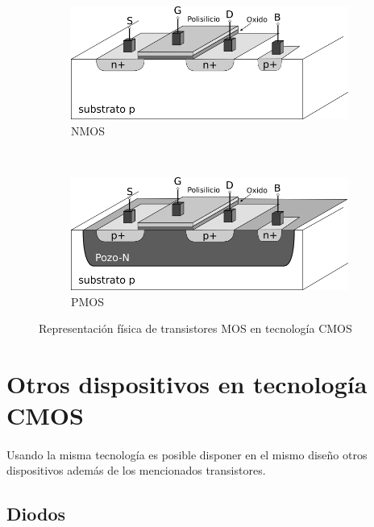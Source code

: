 \begin{figure}
	\centering
	\begin{subfigure}[b]{0.45\textwidth}
		\includegraphics[width=\textwidth]{img/nmos.png}
		\caption{NMOS}
		\label{fig:nmos}
	\end{subfigure}
	~ %
	\begin{subfigure}[b]{0.45\textwidth}
		\includegraphics[width=\textwidth]{img/pmos.png}
		\caption{PMOS}
		\label{fig:pmos}
	\end{subfigure}
	\caption{Representación física de transistores MOS en tecnología CMOS}
	\label{fig:cmos_transistors}
\end{figure}

\section{Otros dispositivos en tecnología CMOS}

\paragraph{}
Usando la misma tecnología es posible disponer en el mismo diseño otros dispositivos
además de los mencionados transistores.

\subsection{Diodos}
